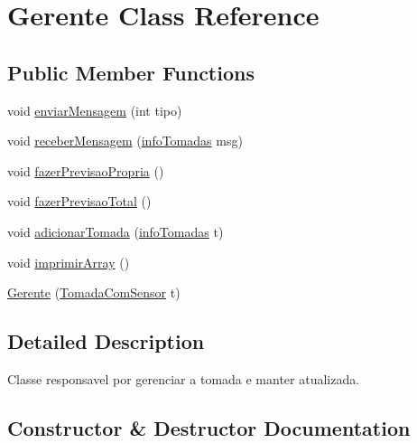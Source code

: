 \hypertarget{class_gerente}{}\section{Gerente Class Reference}
\label{class_gerente}
\subsection*{Public Member Functions}
\begin{DoxyCompactItemize}
\item 
void \hyperlink{class_gerente_a4fbc2a91b489c5567b9fc11b0907a704}{enviar\+Mensagem} (int tipo)
\item 
void \hyperlink{class_gerente_aaa313dd3e4f2d41a11386fc1c70943f6}{receber\+Mensagem} (\hyperlink{structinfo_tomadas}{info\+Tomadas} msg)
\item 
void \hyperlink{class_gerente_a8e830bfb1e376abc966d8fde95eb7f0a}{fazer\+Previsao\+Propria} ()
\item 
void \hyperlink{class_gerente_a1d9686e6c3d4ffdf414f43bd715badc4}{fazer\+Previsao\+Total} ()
\item 
void \hyperlink{class_gerente_aeb96a33350b1328376cbd516ef08efc9}{adicionar\+Tomada} (\hyperlink{structinfo_tomadas}{info\+Tomadas} t)
\item 
void \hyperlink{class_gerente_a4e78cecf07b4f1e85812ba6b6befaa84}{imprimir\+Array} ()
\item 
\hyperlink{class_gerente_a62fdec52bc3522f7633216630941696c}{Gerente} (\hyperlink{class_tomada_com_sensor}{Tomada\+Com\+Sensor} t)
\end{DoxyCompactItemize}


\subsection{Detailed Description}
Classe responsavel por gerenciar a tomada e manter atualizada. 

\subsection{Constructor \& Destructor Documentation}
